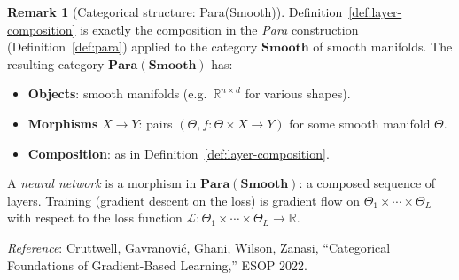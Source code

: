 \documentclass[11pt]{amsart}
\theoremstyle{plain}
\theoremstyle{definition}
\newtheorem{remark}[theorem]{Remark}
\begin{document}
\begin{remark}[Categorical structure: Para(Smooth)]
Definition~\ref{def:layer-composition} is exactly the composition in the
\emph{Para} construction (Definition~\ref{def:para}) applied to the category
$\mathbf{Smooth}$ of smooth manifolds.  The resulting category $\mathbf{Para}(\mathbf{Smooth})$ has:
\begin{itemize}
    \item \textbf{Objects}: smooth manifolds (e.g.\ $\mathbb{R}^{n \times d}$
    for various shapes).
    \item \textbf{Morphisms} $X \to Y$: pairs $(\Theta, f : \Theta \times X \to Y)$
    for some smooth manifold $\Theta$.
    \item \textbf{Composition}: as in Definition~\ref{def:layer-composition}.
\end{itemize}
A \emph{neural network} is a morphism in $\mathbf{Para}(\mathbf{Smooth})$: a
composed sequence of layers.  Training (gradient descent on the loss) is
gradient flow on $\Theta_1 \times \cdots \times \Theta_L$ with respect to the
loss function $\mathcal{L} : \Theta_1 \times \cdots \times \Theta_L \to \mathbb{R}$.

\medskip
\noindent\textit{Reference}: Cruttwell, Gavranović, Ghani, Wilson, Zanasi,
``Categorical Foundations of Gradient-Based Learning,'' ESOP 2022.
\end{remark}
\end{document}

